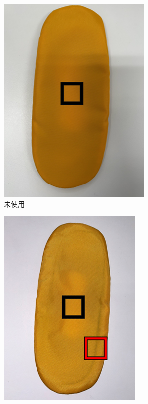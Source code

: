 \documentclass[main]{subfiles}
\begin{document}
\begin{figure}[htbp]
    \centering
    \begin{subfigure}[htbp]{0.3\linewidth}
        \centering
        \includegraphics[keepaspectratio, width=0.8\linewidth, height=\linewidth]{figures/caring_brush_pad/misiyou.png}
        \caption{未使用}
        \label{fig:labelA}
    \end{subfigure}
    \begin{subfigure}[htbp]{0.3\linewidth}
        \centering
        \includegraphics[keepaspectratio, width=0.8\linewidth, height=\linewidth]{figures/caring_brush_pad/10~15A.png}

\end{subfigure}
\end{figure}
\end{document}
